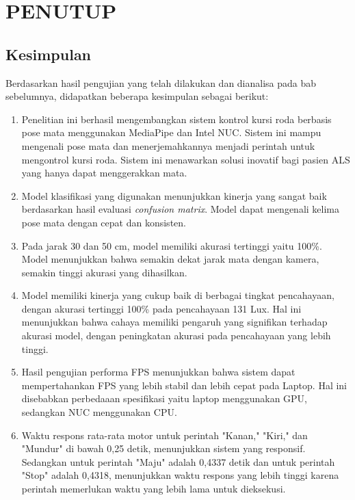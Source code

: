 \chapter{PENUTUP}
\label{chap:penutup}


\section{Kesimpulan}
\label{sec:kesimpulan}

Berdasarkan hasil pengujian yang telah dilakukan dan dianalisa pada bab sebelumnya, didapatkan beberapa kesimpulan sebagai berikut:

\begin{enumerate}[nolistsep]

  \item Penelitian ini berhasil mengembangkan sistem kontrol kursi roda berbasis pose mata menggunakan MediaPipe dan Intel NUC. Sistem ini mampu mengenali pose mata dan menerjemahkannya menjadi perintah untuk mengontrol kursi roda. Sistem ini menawarkan solusi inovatif bagi pasien ALS yang hanya dapat menggerakkan mata.

  \item Model klasifikasi yang digunakan menunjukkan kinerja yang sangat baik berdasarkan hasil evaluasi \emph{confusion matrix}. Model dapat mengenali kelima pose mata dengan cepat dan konsisten.

  \item Pada jarak 30 dan 50 cm, model memiliki akurasi tertinggi yaitu 100\%. Model menunjukkan bahwa semakin dekat jarak mata dengan kamera, semakin tinggi akurasi yang dihasilkan.
  
  \item Model memiliki kinerja yang cukup baik di berbagai tingkat pencahayaan, dengan akurasi tertinggi 100\% pada pencahayaan 131 Lux. Hal ini menunjukkan bahwa cahaya memiliki pengaruh yang signifikan terhadap akurasi model, dengan peningkatan akurasi pada pencahayaan yang lebih tinggi.
  
  \item Hasil pengujian performa FPS menunjukkan bahwa sistem dapat mempertahankan FPS yang lebih stabil dan lebih cepat pada Laptop. Hal ini disebabkan perbedaaan spesifikasi yaitu laptop menggunakan GPU, sedangkan NUC menggunakan CPU.

  \item Waktu respons rata-rata motor untuk perintah "Kanan," "Kiri," dan "Mundur" di bawah 0,25 detik, menunjukkan sistem yang responsif. Sedangkan untuk perintah "Maju" adalah 0,4337 detik dan untuk perintah "Stop" adalah 0,4318, menunjukkan waktu respons yang lebih tinggi karena perintah memerlukan waktu yang lebih lama untuk dieksekusi.
  

\end{enumerate}
